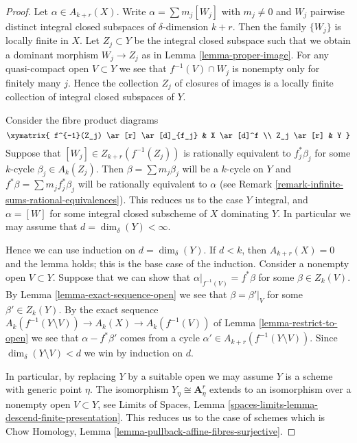 \begin{proof}
Let $\alpha \in A_{k + r}(X)$. Write $\alpha = \sum m_j[W_j]$ with
$m_j \not = 0$ and $W_j$ pairwise distinct integral closed subspaces of
$\delta$-dimension $k + r$. Then the family $\{W_j\}$
is locally finite in $X$. Let $Z_j \subset Y$ be the integral
closed subspace such that we obtain a dominant morphism $W_j \to Z_j$
as in Lemma \ref{lemma-proper-image}. For any quasi-compact open
$V \subset Y$ we see that $f^{-1}(V) \cap W_j$
is nonempty only for finitely many $j$. Hence the
collection $Z_j$ of closures of images is a locally finite collection
of integral closed subspaces of $Y$.

\medskip\noindent
Consider the fibre product diagrams
$$
\xymatrix{
f^{-1}(Z_j) \ar[r] \ar[d]_{f_j} & X \ar[d]^f \\
Z_j \ar[r] & Y
}
$$
Suppose that $[W_j] \in Z_{k + r}(f^{-1}(Z_j))$
is rationally equivalent to $f_j^*\beta_j$ for some
$k$-cycle $\beta_j \in A_k(Z_j)$. Then
$\beta = \sum m_j \beta_j$ will be a $k$-cycle on $Y$
and $f^*\beta = \sum m_j f_j^*\beta_j$ will be rationally
equivalent to $\alpha$ (see
Remark \ref{remark-infinite-sums-rational-equivalences}).
This reduces us to the case $Y$ integral, and
$\alpha = [W]$ for some integral closed subscheme
of $X$ dominating $Y$. In particular we may
assume that $d = \dim_\delta(Y) < \infty$.

\medskip\noindent
Hence we can use induction on $d = \dim_\delta(Y)$.
If $d < k$, then $A_{k + r}(X) = 0$ and the lemma holds;
this is the base case of the induction.
Consider a nonempty open $V \subset Y$.
Suppose that we can show that $\alpha|_{f^{-1}(V)} = f^*\beta$
for some $\beta \in Z_k(V)$. By Lemma \ref{lemma-exact-sequence-open}
we see that
$\beta = \beta'|_V$ for some $\beta' \in Z_k(Y)$.
By the exact sequence
$A_k(f^{-1}(Y \setminus V)) \to A_k(X) \to A_k(f^{-1}(V))$
of Lemma \ref{lemma-restrict-to-open}
we see that $\alpha - f^*\beta'$ comes from
a cycle $\alpha' \in A_{k + r}(f^{-1}(Y \setminus V))$.
Since $\dim_\delta(Y \setminus V) < d$ we win by
induction on $d$.

\medskip\noindent
In particular, by replacing $Y$ by a suitable open we may assume
$Y$ is a scheme with generic point $\eta$. The isomorphism
$Y_\eta \cong \mathbf{A}^r_\eta$ extends to an isomorphism
over a nonempty open $V \subset Y$, see
Limits of Spaces, Lemma \ref{spaces-limits-lemma-descend-finite-presentation}.
This reduces us to the case of schemes which is
Chow Homology, Lemma \ref{lemma-pullback-affine-fibres-surjective}.
\end{proof}


